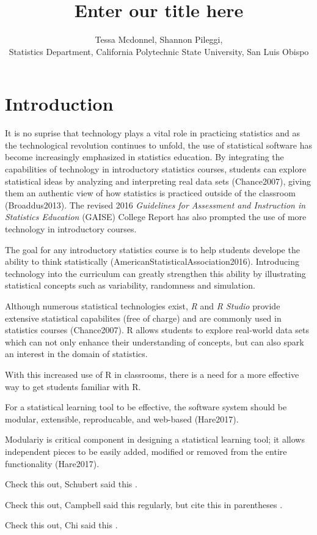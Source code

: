 \documentclass{tise_style}
\title{Enter our title here}
\author{Tessa Mcdonnel, Shannon Pileggi,  \\Statistics Department, California Polytechnic State University, San Luis Obispo}
\begin{document}
\section{Introduction}

It is no suprise that technology plays a vital role in practicing statistics and as the technological revolution continues to 
unfold, the use of statistical software has become increasingly emphasized in statistics education. By integrating the 
capabilities of technology in introductory statistics courses, students can explore statistical ideas by analyzing and 
interpreting real data sets (Chance2007), giving them an authentic view of how statistics is practiced outside of the 
classroom (Broaddus2013). The revised 2016 \textit{Guidelines for Assessment and Instruction in Statistics Education} (GAISE) 
College Report has also prompted the use of more technology in introductory courses.



The goal for any introductory statistics course is to help students develope the ability to think statistically (AmericanStatisticalAssociation2016). 
Introducing technology into the curriculum can greatly strengthen this ability by illustrating statistical concepts such as variability, randomness and simulation.

Although numerous statistical technologies exist, \textit{R} and \textit{R Studio} provide extensive statistical capabilites (free of charge) and are commonly used in statistics courses (Chance2007). R allows students to explore real-world data sets which can not only enhance their understanding of concepts, but can also spark an interest in the domain of statistics.


With this increased use of R in classrooms, there is a need for a more effective way to get students familiar with R.




For a statistical learning tool to be effective, the software system should be modular, extensible, reproducable, and web-based (Hare2017). 

Modulariy is critical component in designing a statistical learning tool; it allows independent pieces to be easily added, modified or removed from the entire functionality (Hare2017). 


Check this out, Schubert said this \cite{Schubert13}.


Check this out, Campbell said this \cite{Campbell02} regularly, but cite this in parentheses \citep{Campbell02}.


Check this out, Chi said this \cite{Chi81}.




\end{document}
